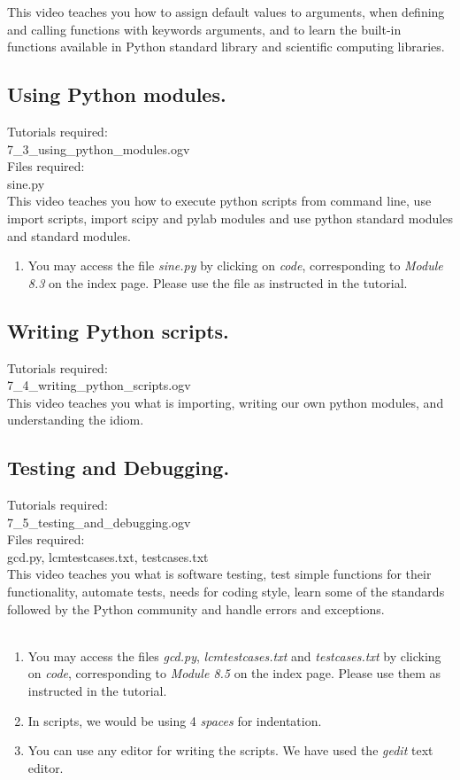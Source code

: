 \documentclass[11pt,twocolumn]{article}
\newenvironment{enumcpt}{\begin{enumerate} \topsep 0pt \partopsep 0pt 
                        \parsep 0pt
                        \itemsep 0pt \leftmargin -1in \rightmargin 0pt
                        }{\end{enumerate}}
\begin{document}
This video teaches you how to assign default values to arguments, when defining and calling functions with keywords arguments, and to learn the built-in functions available in Python standard  library and scientific computing libraries. 
\subsection{Using Python modules.}
 Tutorials required: \\ 7\_3\_using\_python\_modules.ogv \\
 Files required: \\sine.py \\
This video teaches you how to execute python scripts from command line, use import scripts, import scipy and pylab modules and use python standard modules and standard modules.
\begin{enumcpt}
\item You may access the file  \emph{sine.py} by clicking on \emph{code}, corresponding to \emph{Module 8.3} on the index page. Please use the file as instructed in the tutorial. 
\end{enumcpt}

\subsection{Writing Python scripts.}
Tutorials required: \\ 7\_4\_writing\_python\_scripts.ogv \\
This video teaches you what is importing, writing our own python modules, and understanding the idiom.
\subsection{Testing and Debugging.}
Tutorials required: \\ 7\_5\_testing\_and\_debugging.ogv \\
Files required: \\gcd.py, lcmtestcases.txt, testcases.txt \\
This video teaches you what is software testing, test simple functions for their functionality, automate tests, needs for coding style, learn some of the standards followed by the Python community and handle errors and exceptions. \\ \\
\begin{enumcpt}
\item You may access the files \emph{gcd.py}, \emph{lcmtestcases.txt} and \emph{testcases.txt}  by clicking on \emph{code}, corresponding to \emph{Module 8.5} on the index page. Please use them as instructed in the tutorial. 
\item In scripts, we would be using 4 \emph{spaces} for indentation.
\item You can use any editor for writing the scripts. We have used the \emph{gedit} text editor.
\end{enumcpt}
\end{document}
